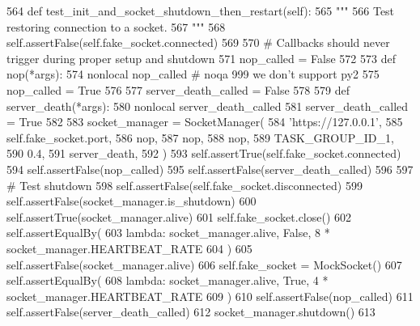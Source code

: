\begin{DoxyCode}
564     \textcolor{keyword}{def }test\_init\_and\_socket\_shutdown\_then\_restart(self):
565         \textcolor{stringliteral}{"""}
566 \textcolor{stringliteral}{        Test restoring connection to a socket.}
567 \textcolor{stringliteral}{        """}
568         self.assertFalse(self.fake\_socket.connected)
569 
570         \textcolor{comment}{# Callbacks should never trigger during proper setup and shutdown}
571         nop\_called = \textcolor{keyword}{False}
572 
573         \textcolor{keyword}{def }nop(*args):
574             nonlocal nop\_called  \textcolor{comment}{# noqa 999 we don't support py2}
575             nop\_called = \textcolor{keyword}{True}
576 
577         server\_death\_called = \textcolor{keyword}{False}
578 
579         \textcolor{keyword}{def }server\_death(*args):
580             nonlocal server\_death\_called
581             server\_death\_called = \textcolor{keyword}{True}
582 
583         socket\_manager = SocketManager(
584             \textcolor{stringliteral}{'https://127.0.0.1'},
585             self.fake\_socket.port,
586             nop,
587             nop,
588             nop,
589             TASK\_GROUP\_ID\_1,
590             0.4,
591             server\_death,
592         )
593         self.assertTrue(self.fake\_socket.connected)
594         self.assertFalse(nop\_called)
595         self.assertFalse(server\_death\_called)
596 
597         \textcolor{comment}{# Test shutdown}
598         self.assertFalse(self.fake\_socket.disconnected)
599         self.assertFalse(socket\_manager.is\_shutdown)
600         self.assertTrue(socket\_manager.alive)
601         self.fake\_socket.close()
602         self.assertEqualBy(
603             \textcolor{keyword}{lambda}: socket\_manager.alive, \textcolor{keyword}{False}, 8 * socket\_manager.HEARTBEAT\_RATE
604         )
605         self.assertFalse(socket\_manager.alive)
606         self.fake\_socket = MockSocket()
607         self.assertEqualBy(
608             \textcolor{keyword}{lambda}: socket\_manager.alive, \textcolor{keyword}{True}, 4 * socket\_manager.HEARTBEAT\_RATE
609         )
610         self.assertFalse(nop\_called)
611         self.assertFalse(server\_death\_called)
612         socket\_manager.shutdown()
613 
\end{DoxyCode}
\mbox{\label{classparlai_1_1mturk_1_1core_1_1legacy__2018_1_1test_1_1test__socket__manager_1_1TestSocketManagerSetupAndFunctions_a3231c70ee94eed118061a00c2f44941f}} 

